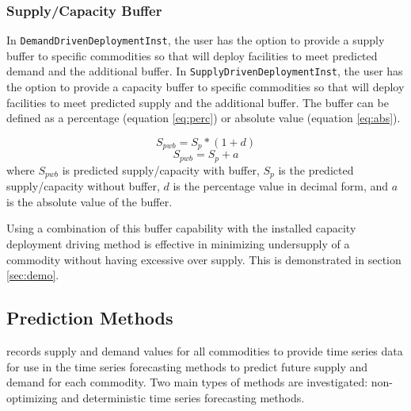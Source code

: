 \subsubsection{Supply/Capacity Buffer}
In \texttt{DemandDrivenDeploymentInst}, the user has the option 
to provide a supply buffer to specific commodities so that 
\deploy will deploy facilities to meet predicted demand and the
additional buffer. 
In \texttt{SupplyDrivenDeploymentInst}, the user has the option 
to provide a capacity buffer to specific commodities so that 
\deploy will deploy facilities to meet predicted supply and the
additional buffer.
The buffer can be defined as a percentage (equation \ref{eq:perc}) 
or absolute value (equation \ref{eq:abs}). 

\begin{equation}
    \label{eq:perc}
    S_{pwb} = S_{p}*(1+d)
\end{equation}
\begin{equation}
    \label{eq:abs}
    S_{pwb} = S_{p}+a
\end{equation}
where $S_{pwb}$ is predicted supply/capacity with buffer, 
$S_p$ is the predicted supply/capacity without buffer, 
$d$ is the percentage value in decimal form, 
and $a$ is the absolute value of the buffer. 

Using a combination of this buffer capability with the 
installed capacity deployment driving method is 
effective in minimizing undersupply of a commodity without 
having excessive over supply. 
This is demonstrated in section \ref{sec:demo}. 

\subsection{Prediction Methods}
\Deploy records supply and demand values for all commodities
to provide time series data for use in the time series forecasting 
methods to predict future supply and demand for each commodity. 
Two main types of methods are investigated: non-optimizing and 
deterministic time series forecasting methods.

\subsection{}